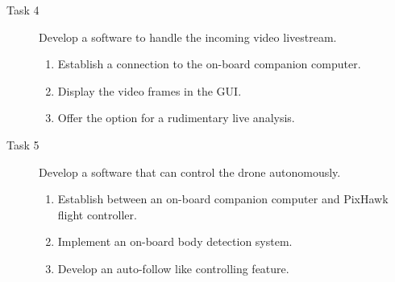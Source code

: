 \begin{description}
\begin{enumerate}
    \end{enumerate}
    \item[Task 4] Develop a software to handle the incoming video livestream.
    \begin{enumerate}
        \item Establish a connection to the on-board companion computer.
        \item Display the video frames in the \acs*{GUI}.
        \item Offer the option for a rudimentary live analysis.
    \end{enumerate}
    \item[Task 5] Develop a software that can control the drone autonomously.
    \begin{enumerate}
        \item Establish between an on-board companion computer and PixHawk
        flight controller.
        \item Implement an on-board body detection system.
        \item Develop an auto-follow like controlling feature. 
    \end{enumerate}
\end{description}
